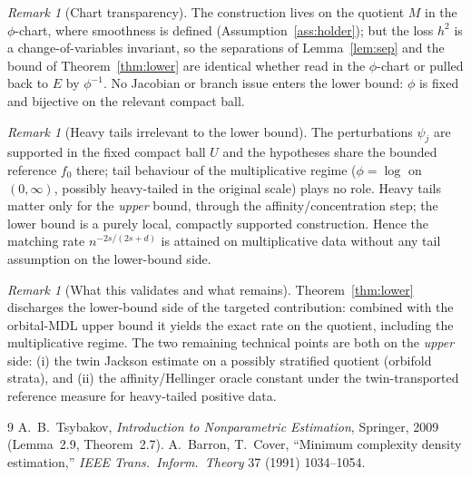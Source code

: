 \documentclass[11pt]{article}
\theoremstyle{plain}
\theoremstyle{definition}
\theoremstyle{remark}
\newtheorem{remark}[theorem]{Remark}
\begin{document}
\begin{remark}[Chart transparency]
The construction lives on the quotient $M$ in the $\phi$-chart, where smoothness is
defined (Assumption~\ref{ass:holder}); but the loss $h^2$ is a change-of-variables
invariant, so the separations of Lemma~\ref{lem:sep} and the bound of
Theorem~\ref{thm:lower} are identical whether read in the $\phi$-chart or pulled
back to $E$ by $\phi^{-1}$. No Jacobian or branch issue enters the lower bound:
$\phi$ is fixed and bijective on the relevant compact ball.
\end{remark}

\begin{remark}[Heavy tails irrelevant to the lower bound]
The perturbations $\psi_j$ are supported in the fixed compact ball $U$ and the
hypotheses share the bounded reference $f_0$ there; tail behaviour of the
multiplicative regime ($\phi=\log$ on $(0,\infty)$, possibly heavy-tailed in the
original scale) plays no role. Heavy tails matter only for the \emph{upper} bound,
through the affinity/concentration step; the lower bound is a purely local,
compactly supported construction. Hence the matching rate
$n^{-2s/(2s+d)}$ is attained on multiplicative data without any tail assumption on
the lower-bound side.
\end{remark}

\begin{remark}[What this validates and what remains]
Theorem~\ref{thm:lower} discharges the lower-bound side of the targeted
contribution: combined with the orbital-MDL upper bound it yields the exact rate
on the quotient, including the multiplicative regime. The two remaining technical
points are both on the \emph{upper} side: (i) the twin Jackson estimate on a
possibly stratified quotient (orbifold strata), and (ii) the affinity/Hellinger
oracle constant under the twin-transported reference measure for heavy-tailed
positive data.
\end{remark}

\begin{thebibliography}{9}
 A.~B.~Tsybakov, \emph{Introduction to Nonparametric
Estimation}, Springer, 2009 (Lemma~2.9, Theorem~2.7).
 A.~Barron, T.~Cover, ``Minimum complexity density
estimation,'' \emph{IEEE Trans.\ Inform.\ Theory} 37 (1991) 1034--1054.
\end{thebibliography}
\end{document}
